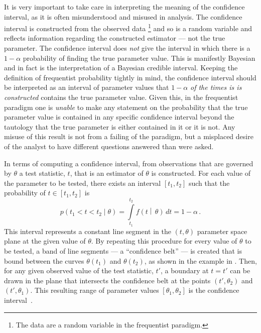 It is very important to take care in interpreting the meaning of the confidence interval, as it is often misunderstood and misused in analysis.
The confidence interval is constructed from the observed data%
\footnote{The data are a random variable in the frequentist paradigm.}
and so is a random variable and reflects information regarding the constructed estimator --- not the true parameter.
The confidence interval does \emph{not} give the interval in which there is a $1-\alpha$ probability of finding the true parameter value.
This is manifestly Bayesian and in fact is the interpretation of a Bayesian credible interval.
Keeping the definition of frequentist probability tightly in mind, the confidence interval should be interpreted as an interval of parameter values that $1-\alpha$ \emph{of the times is is constructed} contains the true parameter value.
Given this, in the frequentist paradigm one is \emph{unable} to make any statement on the probability that the true parameter value is contained in any specific confidence interval beyond the tautology that the true parameter is either contained in it or it is not.
Any misuse of this result is not from a failing of the paradigm, but a misplaced desire of the analyst to have different questions answered than were asked.

In terms of computing a confidence interval, from observations that are governed by $\theta$ a test statistic, $t$, that is an estimator of $\theta$ is constructed.
For each value of the parameter to be tested, there exists an interval $\left[t_{1}, t_{2}\right]$ such that the probability of $t \in \left[t_{1}, t_{2}\right]$ is
\begin{equation}
 p\left(t_{1} < t < t_{2}\middle|\theta\right) = \int\limits_{t_{1}}^{t_{2}} f\left(t\middle|\,\theta\right)\,dt = 1-\alpha\,.
 \label{eq:confidence_interval_coverage}
\end{equation}
This interval represents a constant line segment in the $\left(t, \theta\right)$ parameter space plane at the given value of $\theta$.
By repeating this procedure for every value of $\theta$ to be tested, a band of line segments --- a ``confidence belt'' --- is created that is bound between the curves $\theta\left(t_{1}\right)$ and $\theta\left(t_{2}\right)$, as shown in the example in .
Then, for any given observed value of the test statistic, $t'$, a boundary at $t = t'$ can be drawn in the plane that intersects the confidence belt at the points $\left(t', \theta_{2}\right)$ and $\left(t', \theta_{1}\right)$.
This resulting range of parameter values $\left[\theta_{1}, \theta_{2}\right]$ is the confidence interval~\cite{Cranmer:2015nia,PDG2018:Ch39}.

